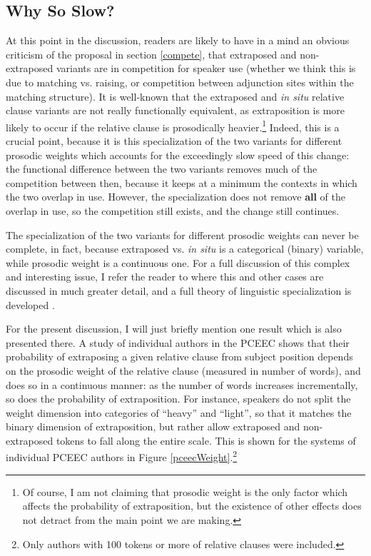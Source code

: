 \subsection{Why So Slow?}
\label{slow}

At this point in the discussion, readers are likely to have in a mind an obvious criticism of the proposal in section \ref{compete}, that extraposed and non-extraposed variants are in competition for speaker use (whether we think this is due to matching vs. raising, or competition between adjunction sites within the matching structure). It is well-known that the extraposed and \textsl{in situ} relative clause variants are not really functionally equivalent, as extraposition is more likely to occur if the relative clause is prosodically heavier.\footnote{Of course, I am not claiming that prosodic weight is the only factor which affects the probability of extraposition, but the existence of other effects does not detract from the main point we are making.} Indeed, this is a crucial point, because it is this specialization of the two variants for different prosodic weights which accounts for the exceedingly slow speed of this change: the functional difference between the two variants removes much of the competition between then, because it keeps at a minimum the contexts in which the two overlap in use. However, the specialization does not remove \textbf{all} of the overlap in use, so the competition still exists, and the change still continues.

The specialization of the two variants for different prosodic weights can never be complete, in fact, because extraposed vs. \textsl{in situ} is a categorical (binary) variable, while prosodic weight is a continuous one. For a full discussion of this complex and interesting issue, I refer the reader to \citet{fruehwaldwallenberginprep} where this and other cases are discussed in much greater detail, and a full theory of linguistic specialization is developed \citep[see also][]{fruehwaldwallenberg2013, wallenberg2013b}.

For the present discussion, I will just briefly mention one result which is also presented there. A study of individual authors in the PCEEC shows that their probability of extraposing a given relative clause from subject position depends on the prosodic weight of the relative clause (measured in number of words), and does so in a continuous manner: as the number of words increases incrementally, so does the probability of extraposition. For instance, speakers do not split the weight dimension into categories of ``heavy'' and ``light'', so that it matches the binary dimension of extraposition, but rather allow extraposed and non-extraposed tokens to fall along the entire scale. This is shown for the systems of individual PCEEC authors in Figure \ref{pceecWeight}.\footnote{Only authors with 100 tokens or more of relative clauses were included.}

